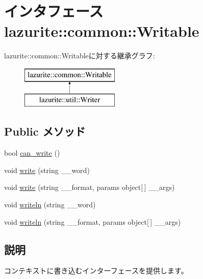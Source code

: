 \hypertarget{interfacelazurite_1_1common_1_1_writable}{
\section{インタフェース lazurite::common::Writable}
\label{interfacelazurite_1_1common_1_1_writable}
}
lazurite::common::Writableに対する継承グラフ:\begin{figure}[H]
\begin{center}
\leavevmode
\includegraphics[height=2cm]{interfacelazurite_1_1common_1_1_writable}
\end{center}
\end{figure}
\subsection*{Public メソッド}
\begin{DoxyCompactItemize}
\item 
bool \hyperlink{interfacelazurite_1_1common_1_1_writable_ab08924bf9f4359d839e406135541b1b1}{can\_\-write} ()
\item 
void \hyperlink{interfacelazurite_1_1common_1_1_writable_a3e89b67f8716f5b22cdae02e2e552706}{write} (string \_\-\_\-word)
\item 
void \hyperlink{interfacelazurite_1_1common_1_1_writable_a3f0f9f537e8a8b3fa86bb13fea5ebef7}{write} (string \_\-\_\-format, params object\mbox{[}$\,$\mbox{]} \_\-\_\-args)
\item 
void \hyperlink{interfacelazurite_1_1common_1_1_writable_a8414621bb09a08186a73c2b9d0f60f3e}{writeln} (string \_\-\_\-word)
\item 
void \hyperlink{interfacelazurite_1_1common_1_1_writable_a44ea83effb9ad385e07938443a2685bb}{writeln} (string \_\-\_\-format, params object\mbox{[}$\,$\mbox{]} \_\-\_\-args)
\end{DoxyCompactItemize}


\subsection{説明}
コンテキストに書き込むインターフェースを提供します。 

